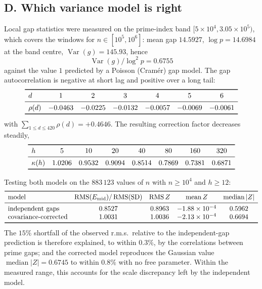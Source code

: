 \documentclass[11pt]{amsart}
\numberwithin{equation}{section}
\theoremstyle{plain}
\theoremstyle{definition}
\theoremstyle{remark}
\begin{document}
\subsection{D. Which variance model is right}
\label{sec:num-variance}
Local gap statistics were measured on the prime-index band
$[5\times10^{4},3.05\times10^{5})$, which covers the windows for
$n\in[10^{5},10^{6}]$: mean gap $14.5927$, $\log p=14.6984$ at the band centre,
$\operatorname{Var}(g)=145.93$, hence
\begin{equation}
\label{eq:gap-variance-ratio}
\operatorname{Var}(g)/\log^{2}p=0.6755
\end{equation}
against the value $1$ predicted by a Poisson (Cram\'er) gap model. The gap
autocorrelation is negative at short lag and positive over a long tail:
\begin{equation}
\label{eq:gap-autocorr-table}
\begin{array}{lcccccc}
\toprule
d & 1 & 2 & 3 & 4 & 5 & 6\\
\midrule
\rho(d) & -0.0463 & -0.0225 & -0.0132 & -0.0057 & -0.0069 & -0.0061\\
\bottomrule
\end{array}
\end{equation}
with $\sum_{1\le d\le420}\rho(d)=+0.4646$. The resulting correction factor
decreases steadily,
\begin{equation}
\label{eq:kappa-table}
\begin{array}{lccccccc}
\toprule
h & 5 & 10 & 20 & 40 & 80 & 160 & 320\\
\midrule
\kappa(h) & 1.0206 & 0.9532 & 0.9094 & 0.8514 & 0.7869 & 0.7381 & 0.6871\\
\bottomrule
\end{array}
\end{equation}

Testing both models on the $883\,123$ values of $n$ with $n\ge10^{4}$ and
$h\ge12$:
\begin{equation}
\label{eq:model-comparison-table}
\begin{array}{lcccc}
\toprule
\text{model} & \operatorname{RMS}(E_{\mathrm{mid}})/\operatorname{RMS}(\mathrm{SD}) & \operatorname{RMS}Z & \operatorname{mean}Z & \operatorname{median}|Z| \\
\midrule
\text{independent gaps} & 0.8527 & 0.8963 & -1.88\times10^{-4} & 0.5962\\
\text{covariance-corrected} & 1.0031 & 1.0036 & -2.13\times10^{-4} & 0.6694\\
\bottomrule
\end{array}
\end{equation}
The $15\%$ shortfall of the observed r.m.s.\ relative to the independent-gap
prediction is therefore explained, to within $0.3\%$, by the correlations
between prime gaps; and the corrected model
reproduces the Gaussian value $\operatorname{median}|Z|=0.6745$ to within $0.8\%$
with no free parameter. Within the measured range, this accounts for the scale discrepancy left by the independent model.
\end{document}
